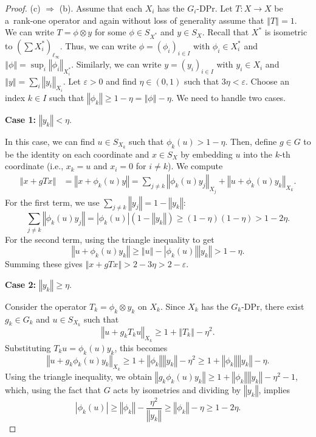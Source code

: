 \documentclass[a4paper,12pt]{amsart}
\theoremstyle{definition}
\theoremstyle{definition}
\theoremstyle{remark}
\numberwithin{equation}{section}
\newcommand{\<}{\langle}
\renewcommand{\>}{\rangle}
\newcommand{\norm}[1]{\left\Vert#1\right\Vert}
\newcommand{\abs}[1]{\left\vert#1\right\vert}
\newcommand{\e}{\varepsilon}
\newcommand{\eps}{\e}
\begin{document}
\begin{proof}
		\noindent
		(c) $\Rightarrow$ (b). Assume that each $X_i$ has the $G_i$-DPr. Let $T: X \to X$ be a~rank-one operator and again without loss of generality assume that $\norm{T} = 1$. We can write $T = \phi \otimes y$ for some $\phi \in S_{X^*}$ and $y \in S_X$.
		Recall that $X^*$ is isometric to $(\sum X_i^*)_{\ell_\infty}$.
		Thus, we can write $\phi = (\phi_i)_{i \in I}$ with $\phi_i \in X_i^*$ and $\norm{\phi} = \sup_i \norm{\phi_i}_{X_i^*}$.
		Similarly, we can write $y = (y_i)_{i \in I}$ with $y_i \in X_i$ and $\norm{y} = \sum_i \norm{y_i}_{X_i}$.
		Let $\eps > 0$ and find $\eta \in (0, 1)$ such that $3\eta < \eps$. Choose an index $k \in I$ such that $\norm{\phi_k} \ge 1 - \eta = \norm{\phi} - \eta$.
		We need to handle two cases.
		
		\noindent
		\textbf{Case 1:} $\norm{y_k} < \eta$.
		
		In this case, we can find $u \in S_{X_k}$ such that $\phi_k(u) > 1 - \eta$. Then, define $g \in G$ to be the identity on each coordinate and $x \in S_X$ by embedding $u$ into the $k$-th coordinate (i.e., $x_k=u$ and $x_i=0$ for $i \neq k$). We compute
		\begin{align*}
			\norm{x + gTx}
			&= \norm{x + \phi_k(u)y} 
			= \sum_{j \neq k} \norm{\phi_k(u) y_j}_{X_j} + \norm{u + \phi_k(u) y_k}_{X_k}.
		\end{align*}
		For the first term, we use $\sum_{j \neq k} \norm{y_j} = 1 - \norm{y_k}$:
		\[
		\sum_{j \neq k} \norm{\phi_k(u) y_j} = \abs{\phi_k(u)} (1 - \norm{y_k}) \ge (1-\eta)(1-\eta) > 1 - 2\eta.
		\]
		For the second term, using the triangle inequality to get
		\[
		\norm{u + \phi_k(u) y_k} \ge \norm{u} - \abs{\phi_k(u)}\norm{y_k} > 1 - \eta.
		\]
		Summing these gives $\norm{x + gTx} > 2 - 3\eta > 2 - \eps$.
		
		
		\noindent
		\textbf{Case 2:} $\norm{y_k} \ge \eta$.
		
		Consider the operator $T_k = \phi_k \otimes y_k$ on $X_k$.
		Since $X_k$ has the $G_k$-DPr, there exist $g_k \in G_k$ and $u \in S_{X_k}$ such that
		\[
		\norm{u + g_k T_k u}_{X_k} \ge 1 + \norm{T_k} - \eta^2.
		\]
		Substituting $T_k u = \phi_k(u)y_k$, this becomes
		\begin{equation} \label{eq:comp_k}
			\norm{u + g_k \phi_k(u) y_k}_{X_k}
			\ge 1 + \norm{\phi_k}\norm{y_k} - \eta^2
			\ge1 + \norm{\phi_k}\norm{y_k} - \eta.
		\end{equation}
		Using the triangle inequality, we obtain $\norm{g_k\phi_k(u)y_k} \ge 1 + \norm{\phi_k}\norm{y_k} - \eta^2 - 1$, which, using the fact that $G$ acts by isometries and dividing by $\norm{y_k}$, implies
		\begin{equation*}
			\abs{\phi_k(u)}
			\ge \norm{\phi_k} - \frac{\eta^2}{\norm{y_k}}
			\ge \norm{\phi_k} - \eta
			\ge 1 - 2\eta.
		\end{equation*}
		

\end{proof}
\end{document}
